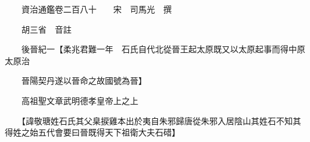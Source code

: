 










 


 
 


 

  
  
  
  
  





  
  
  
  
  
 
  

  

  
  
  



  

 
 

  
   




  

  
  


  　　資治通鑑卷二百八十　　宋　司馬光　撰

　　胡三省　音註

　　後晉紀一【柔兆君難一年　石氏自代北從晉王起太原既又以太原起事而得中原太原治

　　晉陽契丹遂以晉命之故國號為晉】

　　高祖聖文章武明德孝皇帝上之上

　　【諱敬瑭姓石氏其父臬捩雞本出於夷自朱邪歸唐從朱邪入居陰山其姓石不知其得姓之始五代會要曰晉既得天下祖衛大夫石碏】

